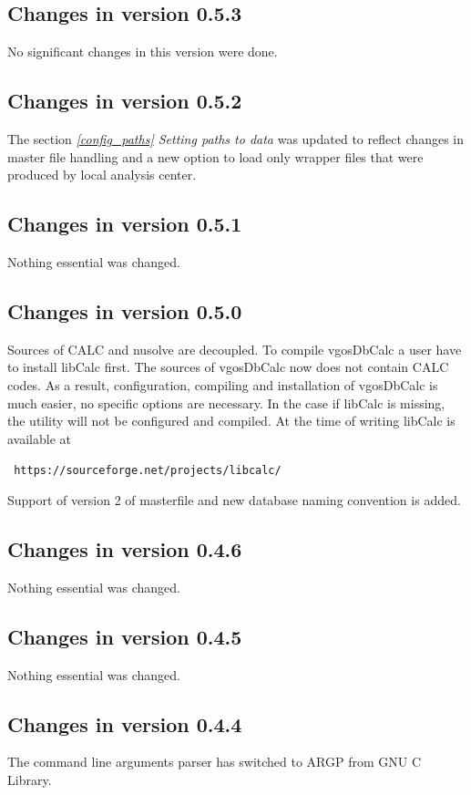 \documentclass [10pt,letterpaper]{report}
\begin{document}
\subsection{Changes in version 0.5.3}
No significant changes in this version were done.

\subsection{Changes in version 0.5.2}
The section \emph{\ref{config_paths} Setting paths to data} was updated to reflect
changes in master file handling and a new option to load only wrapper files that were
produced by local analysis center.



\subsection{Changes in version 0.5.1}
Nothing essential was changed.

\subsection{Changes in version 0.5.0}
Sources of CALC and nusolve are decoupled. To compile vgosDbCalc a user have to
install libCalc first. The sources of vgosDbCalc now does not contain CALC codes.
As a result, configuration, compiling and installation of vgosDbCalc is much easier,
no specific options are necessary. In the case if libCalc is missing, the utility
will not be configured and compiled. At the time of writing libCalc is available at
\begin{center}
{\tt
https://sourceforge.net/projects/libcalc/
}
\end{center}

Support of version 2 of masterfile and new database naming convention is added.

\subsection{Changes in version 0.4.6}
Nothing essential was changed.

\subsection{Changes in version 0.4.5}
Nothing essential was changed.


\subsection{Changes in version 0.4.4}
The command line arguments parser has switched to ARGP from GNU C Library.
\end{document}
